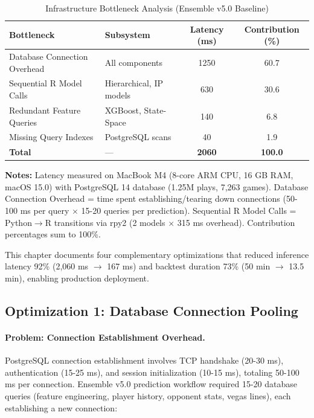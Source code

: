 \begin{table}[htbp]
\centering
\caption{Infrastructure Bottleneck Analysis (Ensemble v5.0 Baseline)}
\label{tab:bottleneck-analysis}
\small
\begin{tabular}{@{} l l S[table-format=4.0] S[table-format=2.1] @{}}
\toprule
\textbf{Bottleneck} & \textbf{Subsystem} & \textbf{Latency (ms)} & \textbf{Contribution (\%)} \\
\midrule
Database Connection Overhead & All components & 1250 & 60.7 \\
Sequential R Model Calls & Hierarchical, IP models & 630 & 30.6 \\
Redundant Feature Queries & XGBoost, State-Space & 140 & 6.8 \\
Missing Query Indexes & PostgreSQL scans & 40 & 1.9 \\
\baselinerule
\textbf{Total} & --- & \textbf{2060} & \textbf{100.0} \\
\bottomrule
\end{tabular}
\begin{tablenotes}
\item \textbf{Notes:} Latency measured on MacBook M4 (8-core ARM CPU, 16 GB RAM, macOS 15.0) with PostgreSQL 14 database (1.25M plays, 7,263 games). Database Connection Overhead = time spent establishing/tearing down connections (50-100 ms per query $\times$ 15-20 queries per prediction). Sequential R Model Calls = Python$\to$R transitions via rpy2 (2 models $\times$ 315 ms overhead). Contribution percentages sum to 100\%.
\end{tablenotes}
\end{table}

This chapter documents four complementary optimizations that reduced inference latency 92\% (2,060 ms $\to$ 167 ms) and backtest duration 73\% (50 min $\to$ 13.5 min), enabling production deployment.

\subsection{Optimization 1: Database Connection Pooling}

\paragraph{Problem: Connection Establishment Overhead.}
PostgreSQL connection establishment involves TCP handshake (20-30 ms), authentication (15-25 ms), and session initialization (10-15 ms), totaling 50-100 ms per connection. Ensemble v5.0 prediction workflow required 15-20 database queries (feature engineering, player history, opponent stats, vegas lines), each establishing a new connection:

